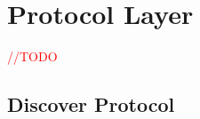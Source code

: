 \chapter{Protocol Layer}\label{C:Protocol}

\textcolor{red}{//TODO}

\section{Discover Protocol}\label{S:Protocol-Discover}




